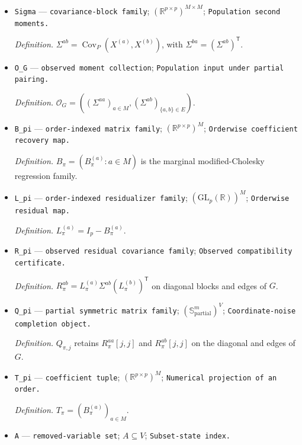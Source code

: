 \documentclass{article}
\begin{document}
\begin{itemize}
  \item \texttt{Sigma} --- \texttt{covariance-\allowbreak{}block family}; \((\mathbb R^{p\times p})^{M\times M}\); \texttt{Population second moments.}
  \par\smallskip\noindent\emph{Definition.} \(\Sigma^{ab}=\operatorname{Cov}_P(X^{(a)},X^{(b)})\), with \(\Sigma^{ba}=(\Sigma^{ab})^{\mathsf T}\).
  \item \texttt{O\_\allowbreak{}G} --- \texttt{observed moment collection}; \texttt{Population input under partial pairing.}
  \par\smallskip\noindent\emph{Definition.} \(\mathcal O_G=((\Sigma^{aa})_{a\in M},(\Sigma^{ab})_{\{a,b\}\in E})\).
  \item \texttt{B\_\allowbreak{}pi} --- \texttt{order-\allowbreak{}indexed matrix family}; \((\mathbb R^{p\times p})^M\); \texttt{Orderwise coefficient recovery map.}
  \par\smallskip\noindent\emph{Definition.} \(B_\pi=(B_\pi^{(a)}:a\in M)\) is the marginal modified-Cholesky regression family.
  \item \texttt{L\_\allowbreak{}pi} --- \texttt{order-\allowbreak{}indexed residualizer family}; \((\mathrm{GL}_p(\mathbb R))^M\); \texttt{Orderwise residual map.}
  \par\smallskip\noindent\emph{Definition.} \(L_\pi^{(a)}=I_p-B_\pi^{(a)}\).
  \item \texttt{R\_\allowbreak{}pi} --- \texttt{observed residual covariance family}; \texttt{Observed compatibility certificate.}
  \par\smallskip\noindent\emph{Definition.} \(R_\pi^{ab}=L_\pi^{(a)}\Sigma^{ab}(L_\pi^{(b)})^{\mathsf T}\) on diagonal blocks and edges of \(G\).
  \item \texttt{Q\_\allowbreak{}pi} --- \texttt{partial symmetric matrix family}; \((\mathbb S_{\mathrm{partial}}^m)^V\); \texttt{Coordinate-\allowbreak{}noise completion object.}
  \par\smallskip\noindent\emph{Definition.} \(Q_{\pi,j}\) retains \(R_\pi^{aa}[j,j]\) and \(R_\pi^{ab}[j,j]\) on the diagonal and edges of \(G\).
  \item \texttt{T\_\allowbreak{}pi} --- \texttt{coefficient tuple}; \((\mathbb R^{p\times p})^M\); \texttt{Numerical projection of an order.}
  \par\smallskip\noindent\emph{Definition.} \(T_\pi=(B_\pi^{(a)})_{a\in M}\).
  \item \texttt{A} --- \texttt{removed-\allowbreak{}variable set}; \(A\subseteq V\); \texttt{Subset-\allowbreak{}state index.}

\end{itemize}
\end{document}
